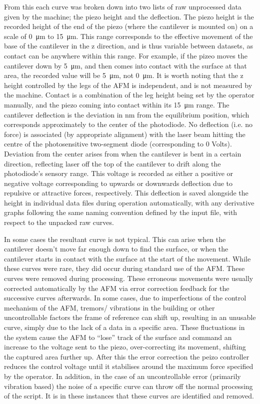 From this each curve was broken down into two lists of raw unprocessed data given by the machine; the piezo height and the deflection. The piezo height is the recorded height of the end of the piezo (where the cantilever is mounted on) on a scale of \SI{0}{\micro\metre} to \SI{15}{\micro\metre}. This range corresponds to the effective movement of the base of the cantilever in the z direction, and is thus variable between datasets, as contact can be anywhere within this range. For example, if the pizeo moves the cantilever down by \SI{5}{\micro\metre}, and then comes into contact with the surface at that area, the recorded value will be \SI{5}{\micro\metre}, not \SI{0}{\micro\metre}. It is worth noting that the z height controlled by the legs of the AFM is independent, and is not measured by the machine. Contact is a combination of the leg height being set by the operator manually, and the piezo coming into contact within its \SI{15}{\micro\metre} range. The cantilever deflection is the deviation in nm from the equilibrium position, which corresponds approximately to the center of the photodiode. No deflection (i.e. no force) is associated (by appropriate alignment) with the laser beam hitting the centre of the photosensitive two-segment diode (corresponding to 0 Volts). Deviation from the center arises from when the cantilever is bent in a certain direction,  reflecting laser off the top of the cantilever to drift along the photodiode's sensory range. This voltage is recorded as either a positive or negative voltage corresponding to upwards or downwards deflection due to repulsive or attractive forces, respectively.  This deflection is saved alongside the height in individual data files during operation automatically, with any derivative graphs following the same naming convention defined by the input file, with respect to the unpacked raw curves. 

In some cases the resultant curve is not typical. This can arise when the cantilever doesn't move far enough down to find the surface, or when the cantilever starts in contact with the surface at the start of the movement. While these curves were rare, they did occur during standard use of the AFM. These curves were removed during processing. These erroneous movements were usually corrected automatically by the AFM via error correction feedback for the successive curves afterwards. In some cases, due to imperfections of the control mechanism of the AFM, tremors/ vibrations in the building or other uncontrollable factors the frame of reference can shift up, resulting in an unusable curve, simply due to the lack of a data in a specific area. These fluctuations in the system cause the AFM to ``lose'' track of the surface and command an increase to the voltage sent to the piezo, over-correcting its movement, shifting the captured area further up. After this the error correction the peizo controller reduces the control voltage until it stabilises around the maximum force specified by the operator. In addition, in the case of an uncontrollable error (primarily vibration based) the noise of a specific curve can throw off the normal processing of the script. It is in these instances that these curves are identified and removed.

